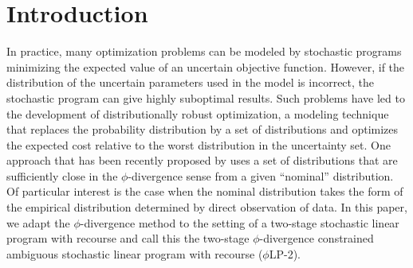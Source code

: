 \documentclass[12pt]{article}
\theoremstyle{plain}
\theoremstyle{definition}
\theoremstyle{remark}
\newcommand{\plp}{$\phi$LP-2}
\begin{document}
%

\section{Introduction}

In practice, many optimization problems can be modeled by stochastic programs minimizing the expected value of an uncertain objective function.
However, if the distribution of the uncertain parameters used in the model is incorrect, the stochastic program can give highly suboptimal results.
Such problems have led to the development of distributionally robust optimization, a modeling technique that replaces the probability distribution by a set of distributions and optimizes the expected cost relative to the worst distribution in the uncertainty set.
One approach that has been recently proposed by \citet{bental2011robust} uses a set of distributions that are sufficiently close in the $\phi$-divergence sense from a given ``nominal'' distribution. 
Of particular interest is the case when the nominal distribution takes the form of the empirical distribution determined by direct observation of data.
In this paper, we adapt the $\phi$-divergence method to the setting of a two-stage stochastic linear program with recourse and call this the two-stage $\phi$-divergence constrained ambiguous stochastic linear program with recourse (\plp).
\end{document}
